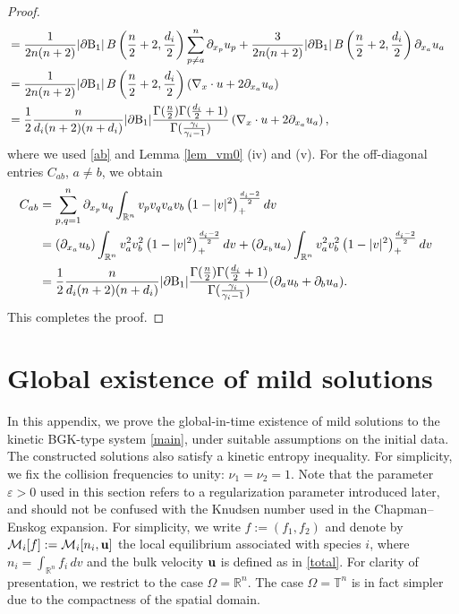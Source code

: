 \documentclass[10pt,reqno]{amsart}
\numberwithin{equation}{section}
\newcommand{\R}{\mathbb R}
\newcommand{\e}{\varepsilon}
\newcommand{\lt}{\left}
\newcommand{\rt}{\right}
\newcommand{\pa}{\partial}
\newcommand{\intr}{\int_{\R^n}}
\newcommand{\calM}{\mathcal M}
\begin{document}
\begin{proof}
\begin{align*}
&=\frac{1}{2n(n+2)} |\partial \mathrm{B}_1| \, B\left(\frac{n}{2}+2, \frac{d_i}{2}\right) \sum_{p\neq a}^n\pa_{x_p}u_p + \frac{3}{2n(n+2)} |\partial \mathrm{B}_1| \, B\left(\frac{n}{2}+2, \frac{d_i}{2}\right)\pa_{x_a}u_a\cr 
&=\frac{1}{2n(n+2)} |\partial \mathrm{B}_1| \, B\left(\frac{n}{2}+2, \frac{d_i}{2}\right) \lt( \nabla_x \cdot u + 2 \pa_{x_a} u_a \rt)\cr 
&=\frac 12\frac{n}{d_i(n+2)(n+d_i)}|\pa {\rm B}_1|\frac{\Gamma(\frac n2)\Gamma(\frac {d_i}{2}+1)}{\Gamma(\frac{\gamma_i}{\gamma_i-1})} \lt( \nabla_x \cdot u + 2 \pa_{x_a} u_a \rt),
\end{align*}
where we used \eqref{ab} and Lemma \ref{lem_vm0} (iv) and (v). For the off-diagonal entries $C_{ab}$, $a \ne b$, we obtain
\begin{align*}
C_{ab}&=\sum_{p,q=1}^n\pa_{x_p}u_q\intr v_p v_q v_av_b \left(1-|v |^2\right)^{\frac{d_i-2}{2}}_+  dv\cr 
&=(\pa_{x_a}u_b)\intr v_a^2 v_b^2 \left(1-|v |^2\right)^{\frac{d_i-2}{2}}_+ dv+(\pa_{x_b}u_a)\intr v_a^2 v_b^2 \left(1-|v |^2\right)^{\frac{d_i-2}{2}}_+  dv\cr 
&=\frac 12\frac{n}{d_i(n+2)(n+d_i)}|\pa {\rm B}_1|\frac{\Gamma(\frac n2)\Gamma(\frac {d_i}{2}+1)}{\Gamma(\frac{\gamma_i}{\gamma_i-1})}(\pa_{a}u_b+\pa_b u_a ).
\end{align*}
This completes the proof.
\end{proof}

 

%
%
%
%
%
%
%
%
%
%
%
%
%


\section{Global existence of mild solutions}\label{app_gwp}

In this appendix, we prove the global-in-time existence of mild solutions to the kinetic BGK-type system \eqref{main}, under suitable assumptions on the initial data. The constructed solutions also satisfy a kinetic entropy inequality. For simplicity, we fix the collision frequencies to unity: $\nu_1 = \nu_2 = 1$. Note that the parameter $\e > 0$ used in this section refers to a regularization parameter introduced later, and should not be confused with the Knudsen number used in the Chapman--Enskog expansion. For simplicity, we write $f := (f_1, f_2)$ and denote by $\calM_i[f] := \calM_i[n_i, \bf u]$ the local equilibrium associated with species $i$, where $n_i = \int_{\R^n} f_i\,dv$ and the bulk velocity $\bf u$ is defined as in \eqref{total}. For clarity of presentation, we restrict to the case $\Omega = \mathbb{R}^n$. The case $\Omega = \mathbb{T}^n$ is in fact simpler due to the compactness of the spatial domain.
 
\end{document}
